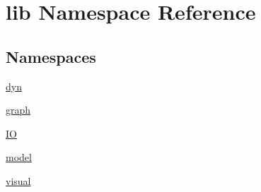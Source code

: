 \hypertarget{a00136}{\section{lib Namespace Reference}
\label{a00136}
}
\subsection*{Namespaces}
\begin{DoxyCompactItemize}
\item 
\hyperlink{a00137}{dyn}
\item 
\hyperlink{a00139}{graph}
\item 
\hyperlink{a00143}{I\-O}
\item 
\hyperlink{a00146}{model}
\item 
\hyperlink{a00149}{visual}
\end{DoxyCompactItemize}
